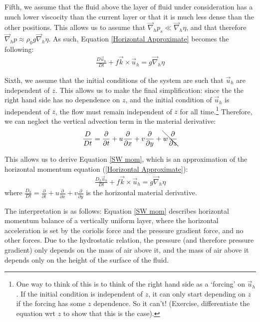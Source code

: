 Fifth, we assume that the fluid above the layer of fluid under consideration has a much lower viscocity than the current layer or that it is much less dense than the other positions. This allows us to assume that \(\vec{\nabla}_hp_s\ll \vec{\nabla}_h\eta\), and that therefore \(\vec{\nabla}_h p \approx \rho_0 g \vec{\nabla}_h \eta\). As such, Equation \ref{Horizontal Approximate} becomes the following:
\begin{align*}
    \frac{D\vec{u}_h}{Dt}+f\vec{k}\times\vec{u}_h=g\vec{\nabla}_h\eta
\end{align*}

Sixth, we assume that the initial conditions of the system are such that \(\vec{u}_h\) are independent of \(z\). This allows us to make the final simplification: since the the right hand side has no dependence on \(z\), and the initial condition of \(\vec{u}_h\) is independent of \(z\), the flow must remain independent of \(z\) for all time.\footnote{
    One way to think of this is to think of the right hand side as a `forcing' on \(\vec{u}_h\). If the initial condition is independent of \(z\), it can only start depending on \(z\) if the forcing has some \(z\) dependence. So it can't! (Exercise, differentiate the equation wrt \(z\) to show that this is the case).
} Therefore, we can neglect the vertical advection term in the material derivative:
\begin{align*}
    \frac{D}{Dt}=\frac{\partial}{\partial t}+u\frac{\partial}{\partial x}
    +v\frac{\partial}{\partial y}+\bcancel{w\frac{\partial}{\partial z}}
\end{align*}

This allows us to derive Equation \ref{SW mom}, which is an approximation of the horizontal momentum equation (\ref{Horizontal Approximate}):
\begin{align*}
    \boxed{\frac{D_h\vec{u}_h}{Dt}+f\vec{k}\times\vec{u}_h=g\vec{\nabla}_h\eta}
\end{align*}
where \(\frac{D_h}{Dt}=\frac{\partial}{\partial t}+u\frac{\partial}{\partial x}+v\frac{\partial}{\partial y}\) is the horizontal material derivative.

The interpretation is as follows: Equation \ref{SW mom} describes horizontal momentum balance of a vertically uniform layer, where the horizontal acceleration is set by the coriolis force and the pressure gradient force, and no other forces. Due to the hydrostatic relation, the pressure (and therefore pressure gradient) only depends on the mass of air above it, and the mass of air above it depends only on the height of the surface of the fluid.

